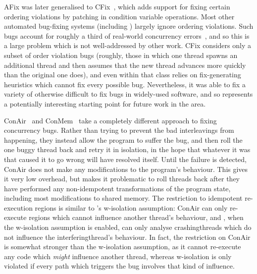 AFix was later generalised to CFix~\cite{Jin2012}, which adds support
for fixing certain ordering violations by patching in condition
variable operations.  Most other automated bug-fixing systems
(including {\technique}) largely ignore ordering violations.  Such
bugs account for roughly a third of real-world concurrency
errors~\cite{Lu2008}, and so this is a large problem which is not
well-addressed by other work.  CFix considers only a subset of order
violation bugs (roughly, those in which one thread spawns an
additional thread and then assumes that the new thread advances more
quickly than the original one does), and even within that class relies
on fix-generating heuristics which cannot fix every possible bug.
Nevertheless, it was able to fix a variety of otherwise difficult to
fix bugs in widely-used software, and so represents a potentially
interesting starting point for future work in the area.

ConAir~\cite{Zhang2013} and ConMem~\cite{Zhang2010} take a completely
different approach to fixing concurrency bugs.  Rather than trying to
prevent the bad interleavings from happening, they instead allow the
program to suffer the bug, and then roll the one buggy thread back and
retry it in isolation, in the hope that whatever it was that caused it
to go wrong will have resolved itself.  Until the failure is detected,
ConAir does not make any modifications to the program's behaviour.
This gives it very low overhead, but makes it problematic to roll
threads back after they have performed any non-idempotent
transformations of the program state, including most modifications to
shared memory.  The restriction to idempotent re-execution regions is
similar to {\technique}'s \gls{w-isolation} assumption: ConAir can
only re-execute regions which cannot influence another thread's
behaviour, and {\technique}, when the \gls{w-isolation} assumption is
enabled, can only analyse \glspl{crashingthread} which do not
influence the \gls{interferingthread}'s behaviour.  In fact, the
restriction on ConAir is somewhat stronger than the \gls{w-isolation}
assumption, as it cannot re-execute any code which \emph{might}
influence another thread, whereas \gls{w-isolation} is only violated
if every path which triggers the bug involves that kind of influence.

